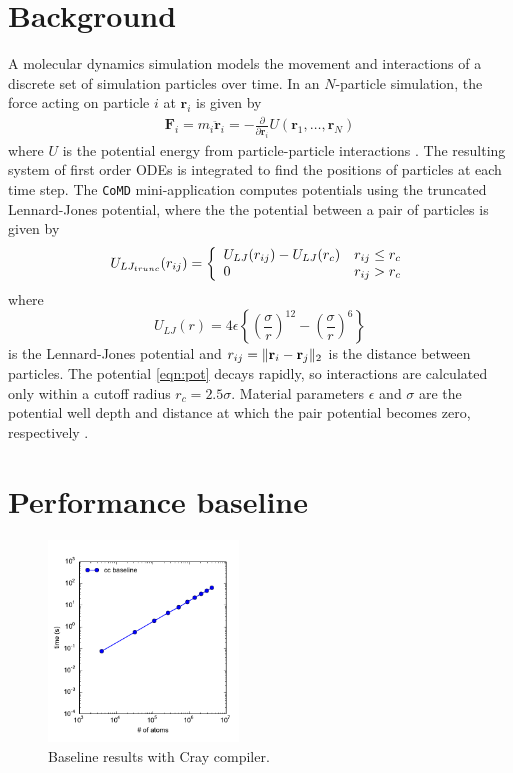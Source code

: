 \documentclass[12pt]{article}
\renewcommand{\v}[1]{\bold{#1}}
\begin{document}
\section{Background}
A molecular dynamics simulation models the movement and interactions
of a discrete set of simulation particles over time. In an
$N$-particle simulation, the force acting on particle $i$ at
$\bm{r}_i$ is given by
\begin{align*}
    \textbf{F}_i = m_i \ddot{\bm{r}}_i = -\frac{\partial}{\partial \bm{r}_i} U(\bm{r}_1, \dots, \bm{r}_N)
\end{align*}
where $U$ is the potential energy from particle-particle interactions
\cite{Intro}.  The resulting system of first order ODEs is integrated
to find the positions of particles at each time step. The
\texttt{CoMD} mini-application computes potentials using the truncated
Lennard-Jones potential, where the the potential between a pair of
particles is given by
\begin{equation}
U_{LJ_{trunc}}(r_{ij}) = 
\left\{ \begin{array}{l c} 
     U_{LJ}(r_{ij}) - U_{LJ}(r_c) & r_{ij} \le r_c \\
     0 & r_{ij} > r_c
        \end{array} \right.
      \label{eqn:pot}
\end{equation}
where
\begin{equation}
    U_{LJ}(r) = 
    4 \epsilon \left\{ \left(\frac{\sigma}{r}\right)^{12} - 
    \left(\frac{\sigma}{r}\right)^6 \right\}
\end{equation}
is the Lennard-Jones potential and $r_{ij} = \|\v{r}_i-\v{r}_j\|_2$ is
the distance between particles. The potential \ref{eqn:pot} decays
rapidly, so interactions are calculated only within a cutoff radius
$r_c = 2.5 \sigma$. Material parameters $\epsilon$ and $\sigma$ are
the potential well depth and distance at which the pair potential
becomes zero, respectively \cite{Wiki}.

\section{Performance baseline}

\begin{figure}[h!]
  \centering
  \includegraphics[width=0.45\textwidth]{../figs/baseline_forceLJ.pdf}
  \caption{Baseline results with Cray compiler.}
  \label{fig:baseline}
\end{figure}
\end{document}
